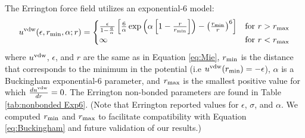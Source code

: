 \documentclass[journal=jctc,manuscript=article]{achemso}
\begin{document}
%

The Errington force field utilizes an exponential-6 model:
\begin{equation} \label{eq:Buckingham}
u^{\rm vdw}(\epsilon,r_{\rm min},\alpha;r) = 
\begin{cases}
\frac{\epsilon}{1-\frac{6}{\alpha}} \left[\frac{6}{\alpha} \exp\left(\alpha\left[1-\frac{r}{r_{\rm min}}\right]\right) - \left(\frac{r_{\rm min}}{r}\right)^6\right] & \text{for}\ r>r_{\rm max} \\
\infty           & \text{for}\ r<r_{\rm max}
\end{cases}
\end{equation}
where $u^{\rm vdw}$, $\epsilon$, and $r$ are the same as in Equation \ref{eq:Mie}, $r_{\rm min}$ is the distance that corresponds to the minimum in the potential (i.e $u^{\rm vdw}(r_{\rm min})=-\epsilon$), $\alpha$ is a Buckingham exponential-6 parameter, and $r_{\rm max}$ is the smallest positive value for which $\frac{du^{\rm vdw}}{dr}=0$. The Errington non-bonded parameters are found in Table \ref{tab:nonbonded Exp6}. (Note that Errington reported values for $\epsilon$, $\sigma$, and $\alpha$. We computed $r_{\rm min}$ and $r_{\rm max}$ to facilitate compatibility with Equation \ref{eq:Buckingham} and future validation of our results.)
\end{document}
